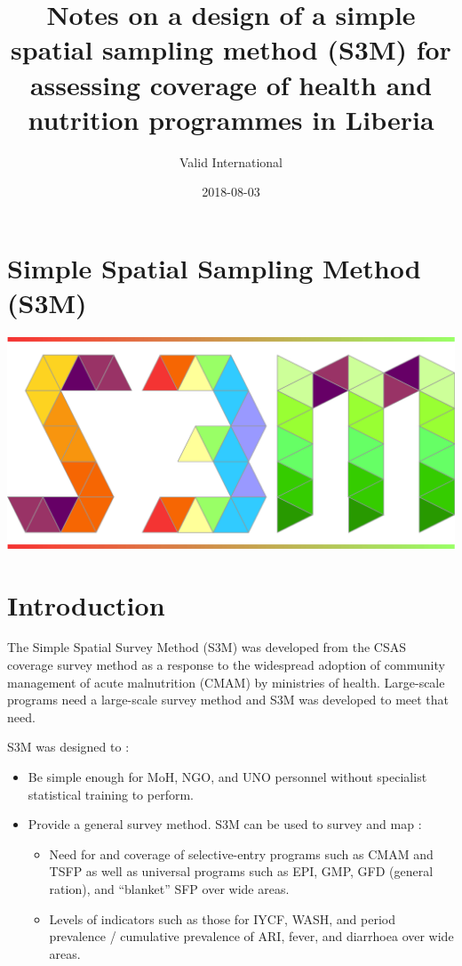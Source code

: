 \documentclass[12pt,a4paper]{book}
\title{Notes on a design of a simple spatial sampling method (S3M) for
assessing coverage of health and nutrition programmes in Liberia}
\author{Valid International}
\date{2018-08-03}
\theoremstyle{definition}
\theoremstyle{definition}
\theoremstyle{definition}
\theoremstyle{remark}
\begin{document}
\maketitle

{
\hypersetup{linkcolor=black}
\setcounter{tocdepth}{1}
\tableofcontents
}
\hypertarget{simple-spatial-sampling-method-s3m}{%
\chapter*{Simple Spatial Sampling Method
(S3M)}\label{simple-spatial-sampling-method-s3m}}

\includegraphics{figures/s3mlogo.png}

\hypertarget{introduction}{%
\chapter{Introduction}\label{introduction}}

The Simple Spatial Survey Method (S3M) was developed from the CSAS
coverage survey method as a response to the widespread adoption of
community management of acute malnutrition (CMAM) by ministries of
health. Large-scale programs need a large-scale survey method and S3M
was developed to meet that need.

S3M was designed to :

\begin{itemize}
\item
  Be simple enough for MoH, NGO, and UNO personnel without specialist
  statistical training to perform.
\item
  Provide a general survey method. S3M can be used to survey and map :

  \begin{itemize}
  \item
    Need for and coverage of selective-entry programs such as CMAM and
    TSFP as well as universal programs such as EPI, GMP, GFD (general
    ration), and ``blanket'' SFP over wide areas.
  \item
    Levels of indicators such as those for IYCF, WASH, and period
    prevalence / cumulative prevalence of ARI, fever, and diarrhoea over
    wide areas.
  \end{itemize}
\end{itemize}
\end{document}
